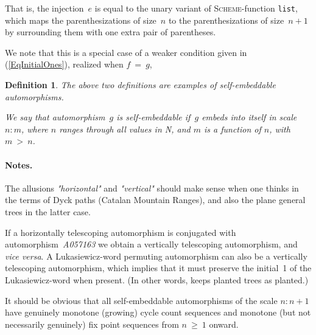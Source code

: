 \documentclass[11pt]{article} %
\newcommand{\eqn}[1]{(\ref{#1})}
\newcommand{\autname}[1]{{\it *#1}}
\newcommand{\autletter}[1]{$#1$}
\newcommand{\automorphismlet}[1]{automorphism~\autletter{#1}}
\newcommand{\automorphism}[1]{automorphism~\autname{#1}}
\newcommand{\proglangname}[1]{{\textsc{#1}}}
\newcommand{\scmsym}[1]{{\tt{#1}}}
\newtheorem{definition}[theorem]{Definition}
\begin{document}
That is, the injection~$e$ is equal to the unary variant of \proglangname{Scheme}-function \scmsym{list},
which maps the parenthesizations of size~$n$
to the parenthesizations of size~$n+1$ by surrounding
them with one extra pair of parentheses.

We note that this is a special case of a weaker condition
given in \eqn{EqInitialOnes}, realized when $f~=~g$,



\begin{definition} %
\normalfont
The above two definitions are examples of {\em self-embeddable} automorphisms.

We say that \automorphismlet{g} is {\em self-embeddable}
if~\autletter{g} embeds into itself in scale $n:m$, where $n$ ranges through all
values in N, and $m$ is a function of $n$, with $m~>~n$.
\end{definition}



\paragraph{Notes.}
The allusions {\em "horizontal"} and {\em "vertical"} should 
make sense when one thinks in the terms of Dyck paths (Catalan
Mountain Ranges), and also the plane general trees in the latter case.

If a horizontally telescoping automorphism is conjugated with
\automorphism{A057163} we obtain a vertically telescoping
automorphism, and {\em vice versa}.
A Lukasiewicz-word permuting automorphism can also be
a vertically telescoping automorphism, which implies
that it must preserve the initial~1 of the Lukasiewicz-word when present.
(In other words, keeps planted trees as planted.)



It should be obvious that all self-embeddable automorphisms of the
scale $n:n+1$ have genuinely monotone (growing) cycle count sequences
and monotone (but not necessarily genuinely) fix point sequences from $n~\ge~1$ onward.
\end{document}
